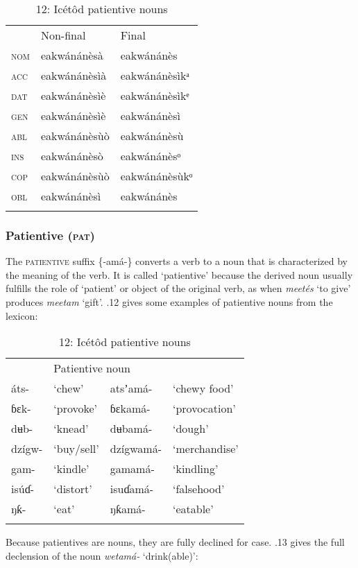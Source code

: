 \begin{table}
\begin{table}
\begin{tabularx}{\textwidth}{XXX} & Non-final & Final\\
\lsptoprule
\textsc{nom} & eakwánánèsà & eakwánánès\\
\textsc{acc} & eakwánánèsìà & eakwánánèsìkᵃ\\
\textsc{dat} & eakwánánèsìè & eakwánánèsìkᵉ\\
\textsc{gen} & eakwánánèsìè & eakwánánèsì\\
\textsc{abl} & eakwánánèsùò & eakwánánèsù\\
\textsc{ins} & eakwánánèsò & eakwánánèsᵒ\\
\textsc{cop} & eakwánánèsùò & eakwánánèsùkᵒ\\
\textsc{obl} & eakwánánèsì & eakwánánès\\
\lspbottomrule
\end{tabularx}
\end{table}

\subsubsection{Patientive (\textsc{pat})}

The \textsc{patientive }suffix \{-amá-\} converts a verb to a noun that is characterized by the meaning of the verb. It is called ‘patientive’ because the derived noun usually fulfills the role of ‘patient’ or object of the original verb, as when \textit{meetés }‘to give’ produces \textit{meetam} ‘gift’. .12 gives some examples of patientive nouns from the lexicon:


\begin{table}
\caption{12: Icétôd patientive nouns}
\label{tab:8}


\begin{tabularx}{\textwidth}{XXXX}
\lsptoprule

\multicolumn{2}{X}{Verb root} & \multicolumn{2}{X}{Patientive noun}\\
áts- & ‘chew’ & atsʼamá- & ‘chewy food’\\
ɓɛk- & ‘provoke’ & ɓɛkamá- & ‘provocation’\\
dʉb- & ‘knead’ & dʉbamá- & ‘dough’\\
dzígw- & ‘buy/sell’ & dzígwamá- & ‘merchandise’\\
gam- & ‘kindle’ & gamamá- & ‘kindling’\\
isúɗ- & ‘distort’ & isuɗamá- & ‘falsehood’\\
ŋƙ- & ‘eat’ & ŋƙamá- & ‘eatable’\\
\lspbottomrule
\end{tabularx}
\end{table}
Because patientives are nouns, they are fully declined for case. .13 gives the full declension of the noun \textit{wetamá- }‘drink(able)’:



\end{table}
